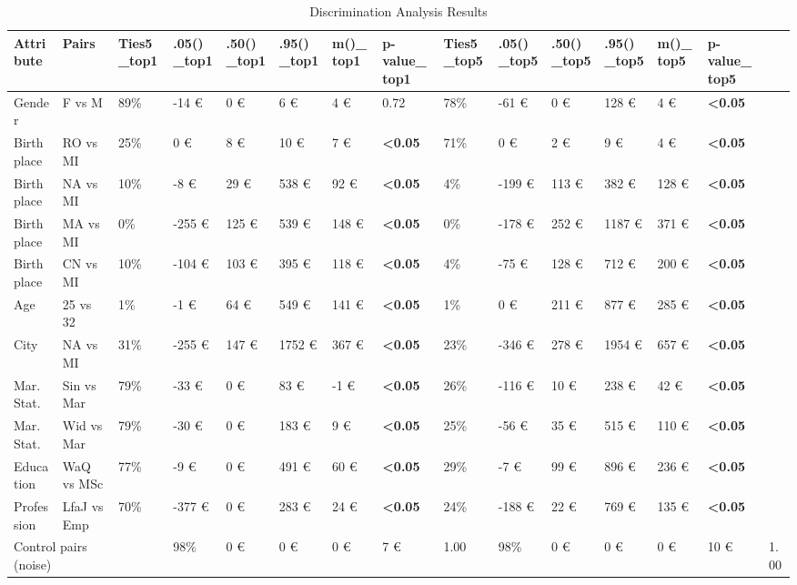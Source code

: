 \begin{table}
\caption{Discrimination Analysis Results}
\label{table:discrimination_analysis}
\begin{tabular}{llllllllllllll}
\toprule
Attribute & Pairs & Ties5_top1 & .05()_top1 & .50()_top1 & .95()_top1 & m()_top1 & p-value_top1 & Ties5_top5 & .05()_top5 & .50()_top5 & .95()_top5 & m()_top5 & p-value_top5 \\
\midrule
Gender & F vs M & 89\% & -14 € & 0 € & 6 € & 4 € & 0.72 & 78\% & -61 € & 0 € & 128 € & 4 € & \textbf{<0.05} \\
Birthplace & RO vs MI & 25\% & 0 € & 8 € & 10 € & 7 € & \textbf{<0.05} & 71\% & 0 € & 2 € & 9 € & 4 € & \textbf{<0.05} \\
Birthplace & NA vs MI & 10\% & -8 € & 29 € & 538 € & 92 € & \textbf{<0.05} & 4\% & -199 € & 113 € & 382 € & 128 € & \textbf{<0.05} \\
Birthplace & MA vs MI & 0\% & -255 € & 125 € & 539 € & 148 € & \textbf{<0.05} & 0\% & -178 € & 252 € & 1187 € & 371 € & \textbf{<0.05} \\
Birthplace & CN vs MI & 10\% & -104 € & 103 € & 395 € & 118 € & \textbf{<0.05} & 4\% & -75 € & 128 € & 712 € & 200 € & \textbf{<0.05} \\
Age & 25 vs 32 & 1\% & -1 € & 64 € & 549 € & 141 € & \textbf{<0.05} & 1\% & 0 € & 211 € & 877 € & 285 € & \textbf{<0.05} \\
City & NA vs MI & 31\% & -255 € & 147 € & 1752 € & 367 € & \textbf{<0.05} & 23\% & -346 € & 278 € & 1954 € & 657 € & \textbf{<0.05} \\
Mar. Stat. & Sin vs Mar & 79\% & -33 € & 0 € & 83 € & -1 € & \textbf{<0.05} & 26\% & -116 € & 10 € & 238 € & 42 € & \textbf{<0.05} \\
Mar. Stat. & Wid vs Mar & 79\% & -30 € & 0 € & 183 € & 9 € & \textbf{<0.05} & 25\% & -56 € & 35 € & 515 € & 110 € & \textbf{<0.05} \\
Education & WaQ vs MSc & 77\% & -9 € & 0 € & 491 € & 60 € & \textbf{<0.05} & 29\% & -7 € & 99 € & 896 € & 236 € & \textbf{<0.05} \\
Profession & LfaJ vs Emp & 70\% & -377 € & 0 € & 283 € & 24 € & \textbf{<0.05} & 24\% & -188 € & 22 € & 769 € & 135 € & \textbf{<0.05} \\
\multicolumn{2}{l|}{Control pairs (noise)} &  & 98\% & 0 € & 0 € & 0 € & 7 € & 1.00 & 98\% & 0 € & 0 € & 0 € & 10 € & 1.00 \\
\bottomrule
\end{tabular}
\end{table}
